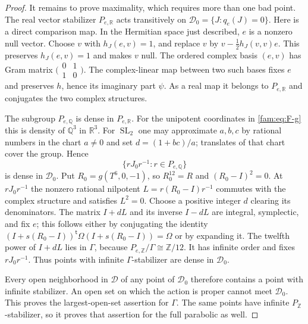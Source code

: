 \begin{proof}
It remains to prove maximality, which requires more than one bad point.
The real vector stabilizer $P_{e,\mathbb R}$ acts transitively on
$\mathcal D_0=\{J:q_e(J)=0\}$.  Here is a direct comparison map.  In the
Hermitian space just described, $e$ is a nonzero null vector.  Choose
$v$ with $h_J(e,v)=1$, and replace $v$ by
$v-\tfrac12h_J(v,v)e$.  This preserves $h_J(e,v)=1$ and makes $v$ null.
The ordered complex basis $(e,v)$ has Gram matrix
$\bigl(\begin{smallmatrix}0&1\\1&0\end{smallmatrix}\bigr)$.
The complex-linear map between two such bases fixes $e$ and preserves
$h$, hence its imaginary part $\psi$.  As a real map it belongs to
$P_{e,\mathbb R}$ and conjugates the two complex structures.

The subgroup $P_{e,\mathbb Q}$ is dense in $P_{e,\mathbb R}$.
For the unipotent coordinates in \eqref{fam:eq:F-g} this is density of
$\mathbb Q^3$ in $\mathbb R^3$.  For $\operatorname{SL}_2$ one may
approximate $a,b,c$ by rational numbers in the chart $a\ne0$ and set
$d=(1+bc)/a$; translates of that chart cover the group.  Hence
\[
 \{rJ_0r^{-1}:r\in P_{e,\mathbb Q}\}
\]
is dense in $\mathcal D_0$.
Put $R_0=g(T^6,0,-1)$, so $R_0^{12}=R$ and
$(R_0-I)^2=0$.  At $rJ_0r^{-1}$ the nonzero rational nilpotent
$L=r(R_0-I)r^{-1}$ commutes with the complex structure and satisfies
$L^2=0$.  Choose a positive integer $d$ clearing its denominators.
The matrix $I+dL$ and its inverse $I-dL$ are integral, symplectic, and
fix $e$; this follows either by conjugating the identity
$(I+s(R_0-I))^{\mathsf t}\Omega(I+s(R_0-I))=\Omega$ or by expanding it.
The twelfth power of $I+dL$ lies in $\Gamma$, because
$P_{e,\mathbb Z}/\Gamma\cong\mathbb Z/12$.  It has infinite order and
fixes $rJ_0r^{-1}$.  Thus points with infinite $\Gamma$-stabilizer are
dense in $\mathcal D_0$.

Every open neighborhood in $\mathcal D$ of any point of $\mathcal D_0$
therefore contains a point with infinite stabilizer.  An open set on
which the action is proper cannot meet $\mathcal D_0$.  This proves the
largest-open-set assertion for $\Gamma$.  The same points have infinite
$P_{\mathbb Z}$-stabilizer, so it proves that assertion for the full
parabolic as well.
\end{proof}

